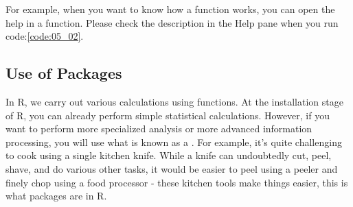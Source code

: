 \documentclass{ltjsbook}
\begin{document}
For example, when you want to know how a function works, you can open the help in a function. Please check the description in the Help pane when you run code:\ref{code:05_02}.

\subsection{Use of Packages}
\label{HowToUseRpackage}
In R, we carry out various calculations using functions. At the installation stage of R, you can already perform simple statistical calculations. However, if you want to perform more specialized analysis or more advanced information processing, you will use what is known as a . For example, it's quite challenging to cook using a single kitchen knife. While a knife can undoubtedly cut, peel, shave, and do various other tasks, it would be easier to peel using a peeler and finely chop using a food processor - these kitchen tools make things easier, this is what packages are in R.
\end{document}
